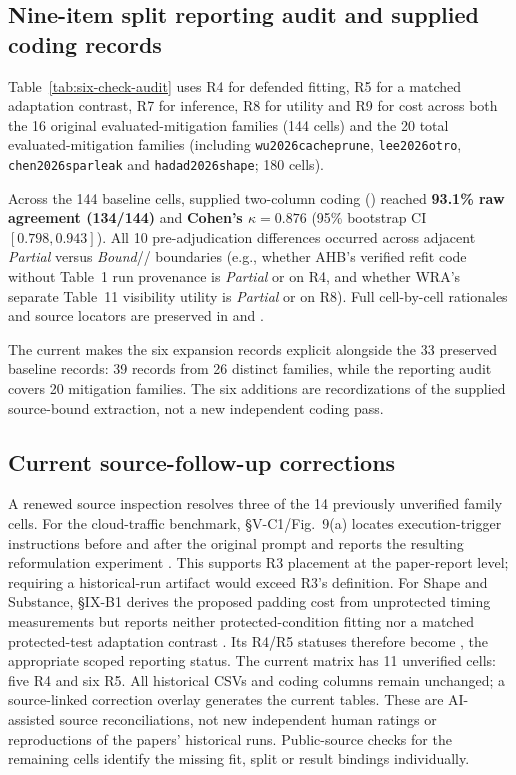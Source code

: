 \subsection{Nine-item split reporting audit and supplied coding records}
Table~\ref{tab:six-check-audit} uses R4 for defended fitting, R5 for a matched adaptation contrast, R7 for inference, R8 for utility and R9 for cost across both the 16 original evaluated-mitigation families (144 cells) and the 20 total evaluated-mitigation families (including \texttt{wu2026cacheprune}, \texttt{lee2026otro}, \texttt{chen2026sparleak} and \texttt{hadad2026shape}; 180 cells).


Across the 144 baseline cells, supplied two-column coding () reached \textbf{93.1\% raw agreement (134/144)} and \textbf{Cohen's $\kappa=0.876$} (95\% bootstrap CI $[0.798,0.943]$). All 10 pre-adjudication differences occurred across adjacent \emph{Partial} versus \emph{Bound}/\NRR{}/\NRV{} boundaries (e.g., whether AHB's verified refit code without Table~1 run provenance is \emph{Partial} or \NRV{} on R4, and whether WRA's separate Table~11 visibility utility is \emph{Partial} or \NRR{} on R8). Full cell-by-cell rationales and source locators are preserved in  and .

The current  makes the six expansion records explicit alongside the 33 preserved baseline records: 39 records from 26 distinct families, while the reporting audit covers 20 mitigation families. The six additions are recordizations of the supplied source-bound extraction, not a new independent coding pass.

\subsection{Current source-follow-up corrections}
A renewed source inspection resolves three of the 14 previously unverified family cells. For the cloud-traffic benchmark, \S V-C1/Fig.~9(a) locates execution-trigger instructions before and after the original prompt and reports the resulting reformulation experiment \cite{pouryousef2026traffic}. This supports R3 placement at the paper-report level; requiring a historical-run artifact would exceed R3's definition. For Shape and Substance, \S IX-B1 derives the proposed padding cost from unprotected timing measurements but reports neither protected-condition fitting nor a matched protected-test adaptation contrast \cite{hadad2026shape}. Its R4/R5 statuses therefore become \NRR{}, the appropriate scoped reporting status. The current matrix has 11 unverified cells: five R4 and six R5. All historical CSVs and coding columns remain unchanged; a source-linked correction overlay generates the current tables. These are AI-assisted source reconciliations, not new independent human ratings or reproductions of the papers' historical runs. Public-source checks for the remaining cells identify the missing fit, split or result bindings individually.
